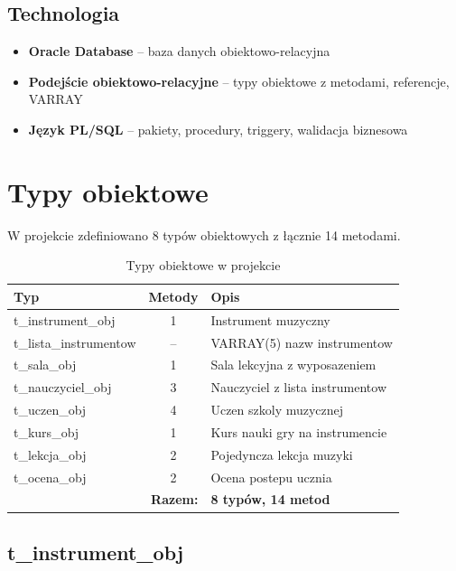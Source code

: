 \documentclass[12pt,a4paper]{article}
\begin{document}
\subsection{Technologia}

\begin{itemize}
    \item \textbf{Oracle Database} -- baza danych obiektowo-relacyjna
    \item \textbf{Podejście obiektowo-relacyjne} -- typy obiektowe z metodami, referencje, VARRAY
    \item \textbf{Język PL/SQL} -- pakiety, procedury, triggery, walidacja biznesowa
\end{itemize}

\section{Typy obiektowe}

W projekcie zdefiniowano 8 typów obiektowych z łącznie 14 metodami.

\begin{table}[h]
\centering
\begin{tabular}{|l|c|p{7cm}|}
\hline
\textbf{Typ} & \textbf{Metody} & \textbf{Opis} \\
\hline
t\_instrument\_obj & 1 & Instrument muzyczny \\
t\_lista\_instrumentow & -- & VARRAY(5) nazw instrumentow \\
t\_sala\_obj & 1 & Sala lekcyjna z wyposazeniem \\
t\_nauczyciel\_obj & 3 & Nauczyciel z lista instrumentow \\
t\_uczen\_obj & 4 & Uczen szkoly muzycznej \\
t\_kurs\_obj & 1 & Kurs nauki gry na instrumencie \\
t\_lekcja\_obj & 2 & Pojedyncza lekcja muzyki \\
t\_ocena\_obj & 2 & Ocena postepu ucznia \\
\hline
\multicolumn{2}{|r|}{\textbf{Razem:}} & \textbf{8 typów, 14 metod} \\
\hline
\end{tabular}
\caption{Typy obiektowe w projekcie}
\end{table}

\subsection{t\_instrument\_obj}
\end{document}
